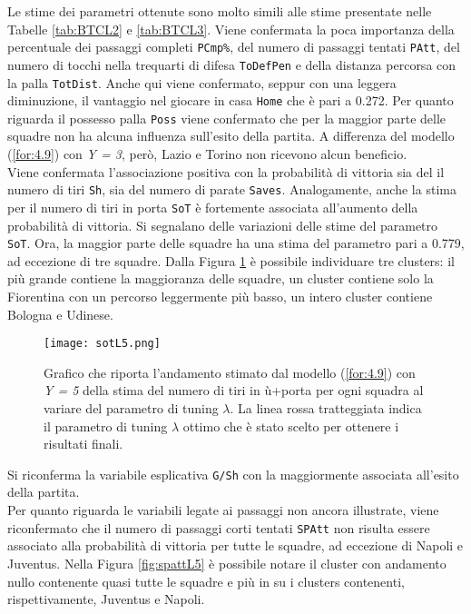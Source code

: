 Le stime dei parametri ottenute sono molto simili alle stime presentate nelle Tabelle \ref{tab:BTCL2} e \ref{tab:BTCL3}. Viene confermata la poca importanza della percentuale dei passaggi completi \texttt{PCmp\%}, del numero di passaggi tentati \texttt{PAtt}, del numero di tocchi nella trequarti di difesa \texttt{ToDefPen} e della distanza percorsa con la palla \texttt{TotDist}.
Anche qui viene confermato, seppur con una leggera diminuzione, il vantaggio nel giocare in casa \texttt{Home} che è pari a 0.272.
Per quanto riguarda il possesso palla \texttt{Poss} viene confermato che per la maggior parte delle squadre non ha alcuna influenza sull'esito della partita. A differenza del modello (\ref{for:4.9}) con \emph{Y = 3}, però, Lazio e Torino non ricevono alcun beneficio.\\
Viene confermata l'associazione positiva con la probabilità di vittoria sia del il numero di tiri \texttt{Sh}, sia del numero di parate \texttt{Saves}. Analogamente, anche la stima per il numero di tiri in porta \texttt{SoT} è fortemente associata all'aumento della probabilità di vittoria. Si segnalano delle variazioni delle stime del parametro \texttt{SoT}. Ora, la maggior parte delle squadre ha una stima del parametro pari a 0.779, ad eccezione di tre squadre. Dalla Figura \ref{fig:sotL5} è possibile individuare tre clusters: il più grande contiene la maggioranza delle squadre, un cluster contiene solo la Fiorentina con un percorso leggermente più basso, un intero cluster contiene Bologna e Udinese.
\begin{figure}[htbp]
	\begin{center}
		\texttt{[image: sotL5.png]}
		\caption{Grafico che riporta l'andamento stimato dal modello (\ref{for:4.9}) con \emph{Y = 5} della stima del numero di tiri in ù+porta per ogni squadra al variare del parametro di tuning $\lambda$. La linea rossa tratteggiata indica il parametro di tuning $\lambda$ ottimo che è stato scelto per ottenere i risultati finali.} \label{fig:sotL5}
	\end{center}
\end{figure}
Si riconferma la variabile esplicativa \texttt{G/Sh} con la maggiormente associata all'esito della partita.\\
Per quanto riguarda le variabili legate ai passaggi non ancora illustrate, viene riconfermato che il numero di passaggi corti tentati \texttt{SPAtt} non risulta essere associato alla probabilità di vittoria per tutte le squadre, ad eccezione di Napoli e Juventus. Nella Figura \ref{fig:spattL5} è possibile notare il cluster con andamento nullo contenente quasi tutte le squadre e più in su i clusters contenenti, rispettivamente, Juventus e Napoli.
